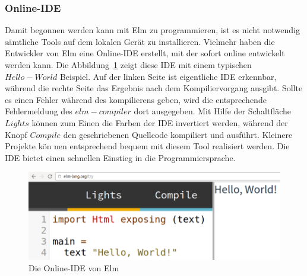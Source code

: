 \subsubsection{Online-IDE}
\label{sec:Online-IDE}
Damit begonnen werden kann mit Elm zu programmieren, ist es nicht notwendig sämtliche Tools auf dem lokalen Gerät zu installieren. Vielmehr haben die Entwickler von Elm eine Online-\ac{IDE} erstellt, mit der sofort online entwickelt werden kann. Die Abbildung~\ref{fig:elm-try} zeigt diese \ac{IDE} mit einem typischen $Hello-World$ Beispiel. Auf der linken Seite ist eigentliche \ac{IDE} erkennbar, während die rechte Seite das Ergebnis nach dem Kompiliervorgang ausgibt. Sollte es einen Fehler während des kompilierens geben, wird die entsprechende Fehlermeldung des $elm-compiler$ dort ausgegeben. Mit Hilfe der Schaltfläche $Lights$ können zum Einen die Farben der \ac{IDE} invertiert werden, während der Knopf $Compile$ den geschriebenen Quellcode kompiliert und ausführt. Kleinere Projekte kön	nen entsprechend bequem mit diesem Tool realisiert werden. Die \ac{IDE} bietet einen schnellen Einstieg in die Programmiersprache.
\begin{figure}[h]
	\centering
	\includegraphics[scale=0.4]{img/elm-try.png}
	\caption{Die Online-\ac{IDE} von Elm}\label{fig:elm-try}
\end{figure}

